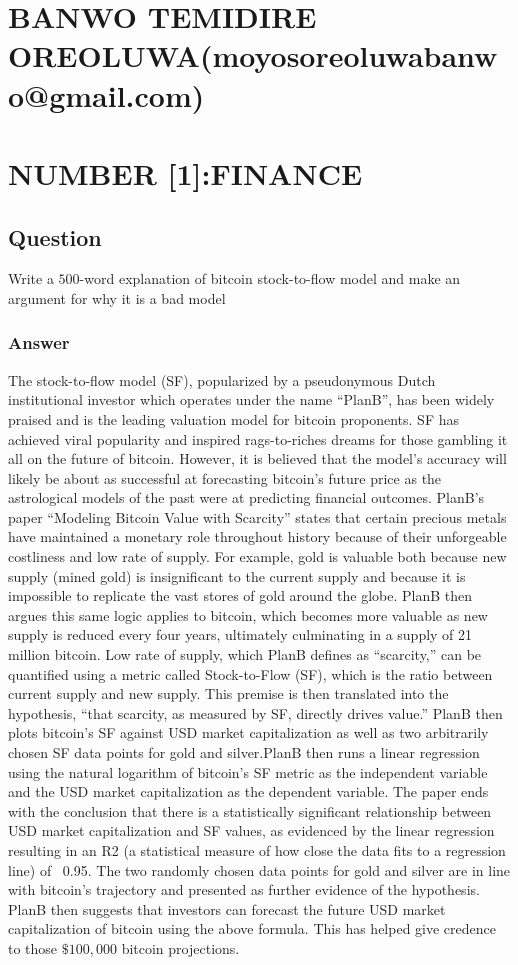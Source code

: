 \documentclass{article}
\begin{document}
\section{BANWO TEMIDIRE OREOLUWA(moyosoreoluwabanwo@gmail.com)}
\section{NUMBER [1]:FINANCE }
\subsection{Question}
Write a $500$-word explanation of bitcoin stock-to-flow model and make an argument for why it is a bad model \\
\subsubsection{Answer}
The stock-to-flow model (SF), popularized by a pseudonymous Dutch institutional investor which operates under the name “PlanB”, has been widely praised and is the leading valuation model for bitcoin proponents. SF has achieved viral popularity and inspired rags-to-riches dreams for those gambling it all on the future of bitcoin. However, it is believed that the model’s accuracy will likely be about as successful at forecasting bitcoin’s future price as the astrological models of the past were at predicting financial outcomes.
PlanB’s paper “Modeling Bitcoin Value with Scarcity” states that certain precious metals have maintained a monetary role throughout history because of their unforgeable costliness and low rate of supply. For example, gold is valuable both because new supply (mined gold) is insignificant to the current supply and because it is impossible to replicate the vast stores of gold around the globe. PlanB then argues this same logic applies to bitcoin, which becomes more valuable as new supply is reduced every four years, ultimately culminating in a supply of 21 million bitcoin. Low rate of supply, which PlanB defines as “scarcity,” can be quantified using a metric called Stock-to-Flow (SF), which is the ratio between current supply and new supply.
This premise is then translated into the hypothesis, “that scarcity, as measured by SF, directly drives value.” PlanB then plots bitcoin’s SF against USD market capitalization as well as two arbitrarily chosen SF data points for gold and silver.PlanB then runs a linear regression using the natural logarithm of bitcoin’s SF metric as the independent variable and the USD market capitalization as the dependent variable. The paper ends with the conclusion that there is a statistically significant relationship between USD market capitalization and SF values, as evidenced by the linear regression resulting in an R2 (a statistical measure of how close the data fits to a regression line) of ~0.95. The two randomly chosen data points for gold and silver are in line with bitcoin’s trajectory and presented as further evidence of the hypothesis. PlanB then suggests that investors can forecast the future USD market capitalization of bitcoin using the above formula. This has helped give credence to those $\$100,000$ bitcoin projections.
\end{document}
